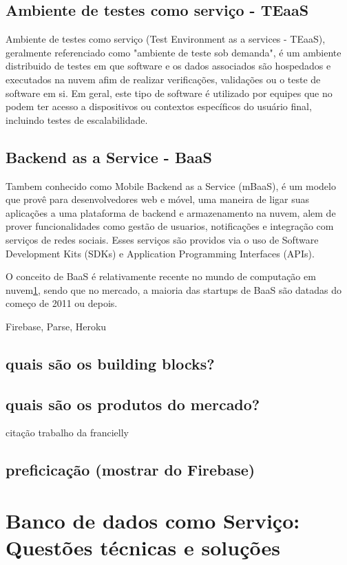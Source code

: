
\subsection{Ambiente de testes como serviço - TEaaS}
	Ambiente de testes como serviço (Test Environment as a services - TEaaS), geralmente referenciado como "ambiente de teste sob demanda", é um ambiente distribuido de testes em que software e os dados associados são hospedados e executados na nuvem afim de realizar verificações, validações ou o teste de software em si. Em geral, este tipo de software é utilizado por equipes que no podem ter acesso a dispositivos ou contextos específicos do usuário final, incluindo testes de escalabilidade.
	

\subsection{Backend as a Service - BaaS}
	Tambem conhecido como Mobile Backend as a Service (mBaaS), é um modelo que provê para desenvolvedores web e móvel, uma maneira de ligar suas aplicações a uma plataforma de backend e armazenamento na nuvem, alem de prover funcionalidades como gestão de usuarios, notificações e integração com serviços de redes sociais. Esses serviços são providos via o uso de Software Development Kits (SDKs) e Application Programming Interfaces (APIs). 
	
	O conceito de BaaS é relativamente recente no mundo de computação em nuvem\ref{}, sendo que no mercado, a maioria das startups de BaaS são datadas do começo de 2011 ou depois.
	
	Firebase, Parse, Heroku

	\subsection{quais são os building blocks?}
	\subsection{quais são os produtos do mercado?}
		citação trabalho da francielly
	\subsection{preficicação (mostrar do Firebase)}



\section{Banco de dados como Serviço: Questões técnicas e soluções}
